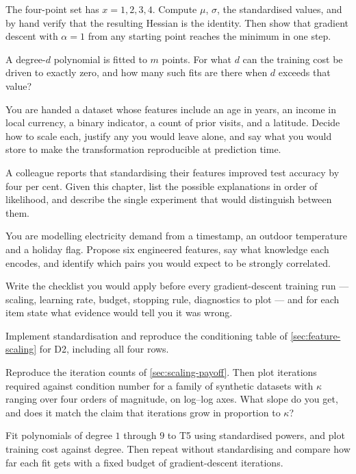 \ap The four-point set has $x = 1,2,3,4$. Compute $\mu$, $\sigma$, the
standardised values, and by hand verify that the resulting Hessian is the
identity. Then show that gradient descent with $\alpha=1$ from any starting
point reaches the minimum in one step.

\ap A degree-$d$ polynomial is fitted to $m$ points. For what $d$ can the
training cost be driven to exactly zero, and how many such fits are there when
$d$ exceeds that value?


\dpr You are handed a dataset whose features include an age in years, an income
in local currency, a binary indicator, a count of prior visits, and a latitude.
Decide how to scale each, justify any you would leave alone, and say what you
would store to make the transformation reproducible at prediction time.

\dpr A colleague reports that standardising their features improved test accuracy
by four per cent. Given this chapter, list the possible explanations in order of
likelihood, and describe the single experiment that would distinguish between
them.

\dpr You are modelling electricity demand from a timestamp, an outdoor
temperature and a holiday flag. Propose six engineered features, say what
knowledge each encodes, and identify which pairs you would expect to be strongly
correlated.

\dpr Write the checklist you would apply before every gradient-descent training
run --- scaling, learning rate, budget, stopping rule, diagnostics to plot ---
and for each item state what evidence would tell you it was wrong.


\pe Implement standardisation and reproduce the conditioning table of
\cref{sec:feature-scaling} for D2, including all four rows.

\pe Reproduce the iteration counts of \cref{sec:scaling-payoff}. Then plot
iterations required against condition number for a family of synthetic datasets
with $\kappa$ ranging over four orders of magnitude, on log--log axes. What slope
do you get, and does it match the claim that iterations grow in proportion
to $\kappa$?

\pe Fit polynomials of degree $1$ through $9$ to T5 using standardised powers,
and plot training cost against degree. Then repeat without standardising and
compare how far each fit gets with a fixed budget of gradient-descent iterations.

